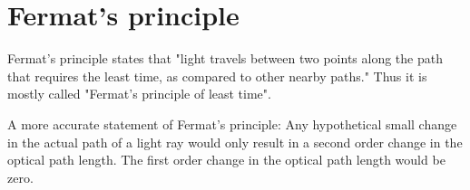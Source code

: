 \documentclass[../main.tex]{subfiles}
\begin{document}
	\section{Fermat's principle}

	Fermat's principle states that "light travels between two points along the path that requires the least time, as compared to other nearby paths." Thus it is mostly called "Fermat’s principle of least time".

	A more accurate statement of Fermat's principle: Any hypothetical small change in the actual path of a light ray would only result in a second order change in the optical path length. The first order change in the optical path length would be zero.
\end{document}
